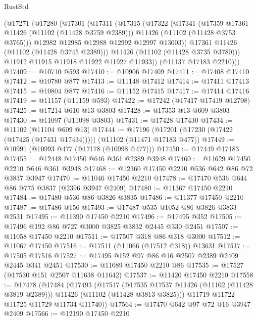 \begin{lexlean}{RustStd}
\begin{coremodule}
        (@17271
          (@17280
            (@17301
              (@17311
                (@17315
                  (@17322
                    (@17341
                      (@17359 @17361 @11426 (@11102 (@11428 @3759 @2389)))
                      @11426
                      (@11102 (@11428 @3753 @3765)))
                    @12982
                    @12985
                    @12988
                    @12992
                    @12997
                    @13003))
                @17361
                @11426
                (@11102 (@11428 @3745 @2389)))
              @11426
              (@11102 (@11428 @3735 @3780)))
            @11912
            @11915
            @11918
            @11922
            @11927
            @11933))
        (@11137 @17183 @2210)))
@17409 := @10710 @593
@17410 := @10906 @17409
@17411 := @17408 @17410
@17412 := @10780 @877
@17413 := @11148 @17412
@17414 := @17411 @17413
@17415 := @10804 @877
@17416 := @11152 @17415
@17417 := @17414 @17416
@17419 := @11157 (@11159 @593)
@17422 := @17242 (@17417 @17419 @12708)
@17425 := @17214 @610 @13 @3803
@17428 := @17353 @13 @609 @3803
@17430 := @11097 (@11098 @3803)
@17431 := @17428 @17430
@17434 := @11102 (@11104 @609 @13)
@17444 := @17196 (@17201 (@17230 (@17422 (@17425 (@17431 @17434))))) (@11102 (@11471 @17183 @477))
@17449 := @10991 (@10993 @477 (@17178 (@10998 @477)))
@17450 := @17449 @17183
@17455 := @12448 @17450 @646 @361 @2389 @3948
@17460 := @11629 @17450 @2210 @646 @361 @3948
@17468 := @12360 @17450 @2210 @536 @642 @86 @72 @3837 @3947
@17470 := @11046 @17450 @2210
@17478 := @17470 @536 @644 @86 @775 @3837 (@2396 @3947 @2409)
@17480 := @11367 @17450 @2210
@17484 := @17480 @536 @86 @3826 @3835
@17486 := @11377 @17450 @2210
@17487 := @17486 @156
@17493 := @17487 @535 @1052 @86 @3826 @3833 @2531
@17495 := @11390 @17450 @2210
@17496 := @17495 @352
@17505 := @17496 @192 @86 @727 @3000 @3825 @3832 @2445 @330 @2451
@17507 := @11058 @17450 @2210
@17511 := @17507 @318 @86 @318 @3000
@17512 := @11067 @17450
@17516 := @17511 (@11066 (@17512 @318)) @13631
@17517 := @17505 @17516
@17527 := @17495 @152 @97 @86 @16 @2507 @2389 @2409 @2445 @341 @2451
@17530 := @11089 @17450 @2210 @86
@17535 := @17527 (@17530 @151 @2507 @11638 @11642)
@17537 := @11420 @17450 @2210
@17558 := @17478
    (@17484
      (@17493
        (@17517
          (@17535 @17537 @11426 (@11102 (@11428 @3819 @2389)))
          @11426
          (@11102 (@11428 @3813 @3825)))
        @11719
        @11722
        @11725
        @11729
        @11734
        @11740))
@17564 := @17470 @642 @97 @72 @16 @3947 @2409
@17566 := @12190 @17450 @2210

\end{coremodule}
\end{lexlean}
